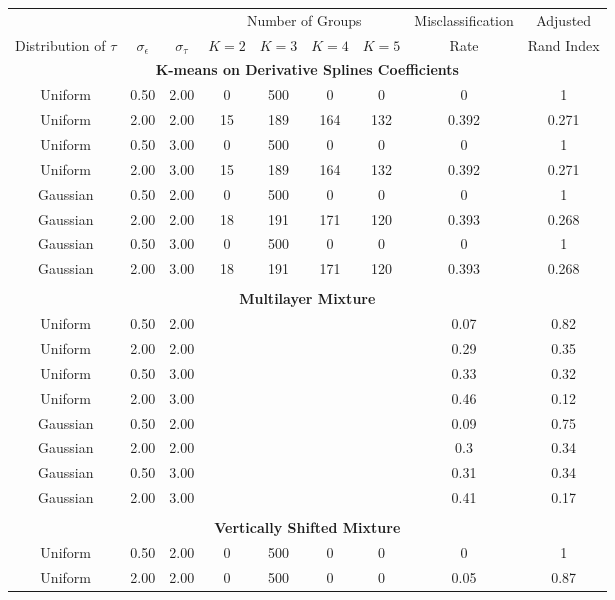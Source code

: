 \begin{table}[ht]
\begin{center}
\begin{tabular}{ccc|cccccc}
  \hline &&&\multicolumn{4}{c}{Number of Groups}&Misclassification&Adjusted\\ Distribution of $\tau$&$\sigma_{\epsilon}$&$\sigma_{\tau}$&$K=2$&$K=3$&$K=4$&$K=5$&Rate&Rand Index\\ \hline\multicolumn{9}{c}{\textbf{K-means on Derivative Splines Coefficients}}\\ Uniform & 0.50 & 2.00 & 0 & 500 & 0 & 0 & 0 & 1 \\ 
  Uniform & 2.00 & 2.00 & 15 & 189 & 164 & 132 & 0.392 & 0.271 \\ 
  Uniform & 0.50 & 3.00 & 0 & 500 & 0 & 0 & 0 & 1 \\ 
  Uniform & 2.00 & 3.00 & 15 & 189 & 164 & 132 & 0.392 & 0.271 \\ 
  Gaussian & 0.50 & 2.00 & 0 & 500 & 0 & 0 & 0 & 1 \\ 
  Gaussian & 2.00 & 2.00 & 18 & 191 & 171 & 120 & 0.393 & 0.268 \\ 
  Gaussian & 0.50 & 3.00 & 0 & 500 & 0 & 0 & 0 & 1 \\ 
  Gaussian & 2.00 & 3.00 & 18 & 191 & 171 & 120 & 0.393 & 0.268 \\ 
   \\ \multicolumn{9}{c}{\textbf{Multilayer Mixture}}\\Uniform & 0.50 & 2.00 &  &  &  &  & 0.07 & 0.82 \\ 
  Uniform & 2.00 & 2.00 &  &  &  &  & 0.29 & 0.35 \\ 
  Uniform & 0.50 & 3.00 &  &  &  &  & 0.33 & 0.32 \\ 
  Uniform & 2.00 & 3.00 &  &  &  &  & 0.46 & 0.12 \\ 
  Gaussian & 0.50 & 2.00 &  &  &  &  & 0.09 & 0.75 \\ 
  Gaussian & 2.00 & 2.00 &  &  &  &  & 0.3 & 0.34 \\ 
  Gaussian & 0.50 & 3.00 &  &  &  &  & 0.31 & 0.34 \\ 
  Gaussian & 2.00 & 3.00 &  &  &  &  & 0.41 & 0.17 \\ 
   \\ \multicolumn{9}{c}{\textbf{Vertically Shifted Mixture}}\\Uniform & 0.50 & 2.00 & 0 & 500 & 0 & 0 & 0 & 1 \\ 
  Uniform & 2.00 & 2.00 & 0 & 500 & 0 & 0 & 0.05 & 0.87 \\ 

\end{tabular}
\end{center}
\end{table}
